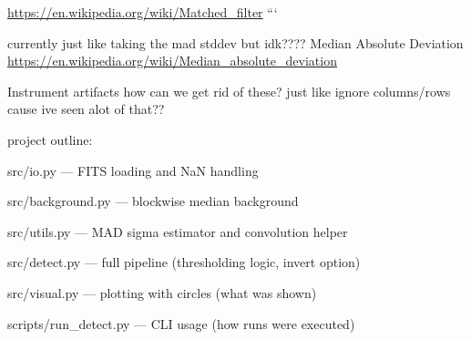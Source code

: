 \documentclass{article}
\begin{document}
\url{https://en.wikipedia.org/wiki/Matched_filter}
```

currently just like taking the mad stddev but idk????
Median Absolute Deviation
\url{https://en.wikipedia.org/wiki/Median_absolute_deviation}



Instrument artifacts
how can we get rid of these?
just like ignore columns/rows cause ive seen alot of that??


project outline:

src/io.py — FITS loading and NaN handling

src/background.py — blockwise median background

src/utils.py — MAD sigma estimator and convolution helper

src/detect.py — full pipeline (thresholding logic, invert option)

src/visual.py — plotting with circles (what was shown)

scripts/run\_detect.py — CLI usage (how runs were executed)
\end{document}
